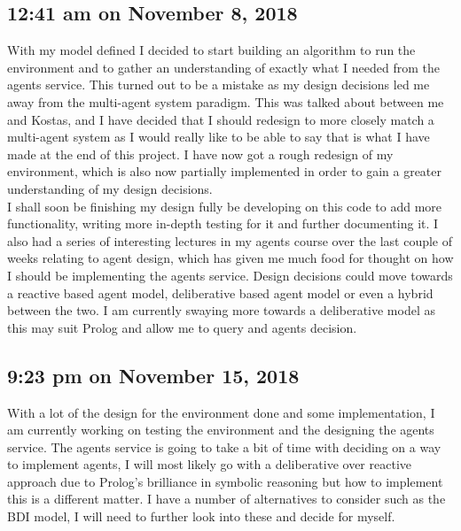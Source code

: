 \documentclass[]{final_report}
\begin{document}
\subsection*{12:41 am on November 8, 2018}
With my model defined I decided to start building an algorithm to run the environment and to gather an understanding of exactly what I needed from the agents service. This turned out to be a mistake as my design decisions led me away from the multi-agent system paradigm. This was talked about between me and Kostas, and I have decided that I should redesign to more closely match a multi-agent system as I would really like to be able to say that is what I have made at the end of this project. I have now got a rough redesign of my environment, which is also now partially implemented in order to gain a greater understanding of my design decisions.\\
I shall soon be finishing my design fully be developing on this code to add more functionality, writing more in-depth testing for it and further documenting it. I also had a series of interesting lectures in my agents course over the last couple of weeks relating to agent design, which has given me much food for thought on how I should be implementing the agents service. Design decisions could move towards a reactive based agent model, deliberative based agent model or even a hybrid between the two. I am currently swaying more towards a deliberative model as this may suit Prolog and allow me to query and agents decision. 

\subsection*{9:23 pm on November 15, 2018}
With a lot of the design for the environment done and some implementation, I am currently working on testing the environment and the designing the agents service. The agents service is going to take a bit of time with deciding on a way to implement agents, I will most likely go with a deliberative over reactive approach due to Prolog’s brilliance in symbolic reasoning but how to implement this is a different matter. I have a number of alternatives to consider such as the BDI model, I will need to further look into these and decide for myself.
\end{document}
